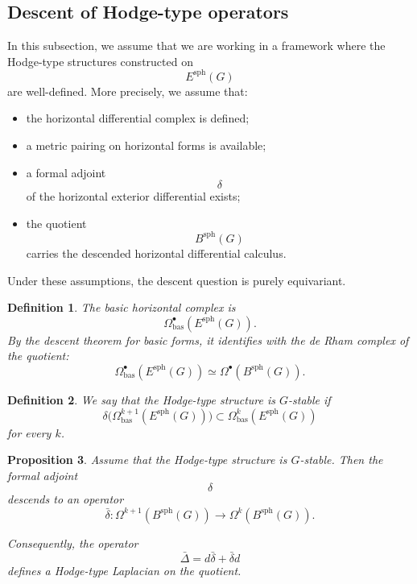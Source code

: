 \documentclass[11pt]{amsart}
\newtheorem{definition}{Definition}[section]
\newtheorem{proposition}[definition]{Proposition}
\begin{document}
\subsection{Descent of Hodge-type operators}

In this subsection, we assume that we are working in a framework where the
Hodge-type structures constructed on
\[
E^{\mathrm{sph}}(G)
\]
are well-defined. More precisely, we assume that:
\begin{itemize}
\item the horizontal differential complex is defined;
\item a metric pairing on horizontal forms is available;
\item a formal adjoint
\[
\delta
\]
of the horizontal exterior differential exists;
\item the quotient
\[
B^{\mathrm{sph}}(G)
\]
carries the descended horizontal differential calculus.
\end{itemize}

Under these assumptions, the descent question is purely equivariant.

\begin{definition}
The basic horizontal complex is
\[
\Omega^\bullet_{\mathrm{bas}}(E^{\mathrm{sph}}(G)).
\]
By the descent theorem for basic forms, it identifies with the de Rham complex
of the quotient:
\[
\Omega^\bullet_{\mathrm{bas}}(E^{\mathrm{sph}}(G))
\simeq
\Omega^\bullet(B^{\mathrm{sph}}(G)).
\]
\end{definition}

\begin{definition}
We say that the Hodge-type structure is \(G\)-stable if
\[
\delta\bigl(
\Omega^{k+1}_{\mathrm{bas}}(E^{\mathrm{sph}}(G))
\bigr)
\subset
\Omega^k_{\mathrm{bas}}(E^{\mathrm{sph}}(G))
\]
for every \(k\).
\end{definition}

\begin{proposition}
Assume that the Hodge-type structure is \(G\)-stable. Then the formal adjoint
\[
\delta
\]
descends to an operator
\[
\bar\delta:
\Omega^{k+1}(B^{\mathrm{sph}}(G))
\longrightarrow
\Omega^k(B^{\mathrm{sph}}(G)).
\]

Consequently, the operator
\[
\bar\Delta
=
d\bar\delta+\bar\delta d
\]
defines a Hodge-type Laplacian on the quotient.
\end{proposition}
\end{document}
